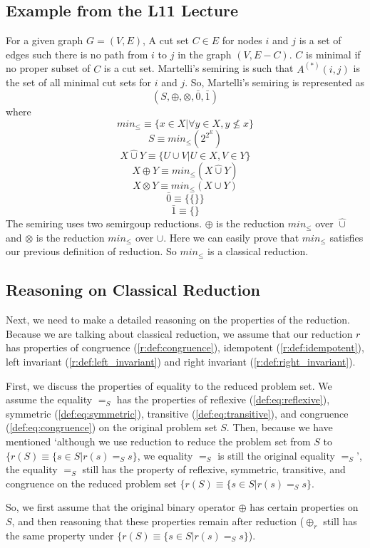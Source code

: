\documentclass[a4paper,12pt,twoside,openright]{report}
\begin{document}
\subsection{Example from the L11 Lecture}
For a given graph $G = (V,E)$, A cut set $C \in E$ for nodes $i$ and $j$ is a set of edges such there is no path from $i$ to $j$ in the graph $(V, E - C)$. $C$ is minimal if no proper subset of $C$ is a cut set. Martelli’s semiring \cite{martelli_gaussian_1976} is such that $A^{(*)}(i, j)$ is the set of all minimal cut sets for $i$ and $j$. 
So, Martelli’s semiring is represented as \[(S,\oplus,\otimes,\bar0,\bar1)\] where 
\[min_\leq \equiv \{ x \in X | \forall y \in X, y \not\leq x \}\]
\[S \equiv min_\leq(2^{2^E})\] 
\[X \hat{\cup} Y \equiv \{U \cup V | U \in X, V \in Y\}\]
\[X\oplus Y \equiv min_\leq(X \hat{\cup} Y)\] 
\[X\otimes Y \equiv min_\leq(X \cup Y)\] 
\[\bar0 \equiv \{\{\}\}\] 
\[\bar1 \equiv \{\}\]
The semiring uses two semirgoup reductions. $\oplus$ is the reduction $min_\leq$ over $\hat{\cup}$ and $\otimes$ is the reduction $min_\leq$ over $\cup$.
Here we can easily prove that $min_\leq$ satisfies our previous definition of reduction. So $min_\leq$ is a classical reduction.
\subsection{Reasoning on Classical Reduction}
Next, we need to make a detailed reasoning on the properties of the reduction.
Because we are talking about classical reduction, we assume that our reduction $r$ has properties of congruence (\ref{r:def:congruence}), idempotent (\ref{r:def:idempotent}), left invariant (\ref{r:def:left_invariant}) and right invariant (\ref{r:def:right_invariant}).

First, we discuss the properties of equality to the reduced problem set. We assume the equality $=_S$ has the properties of reflexive (\ref{def:eq:reflexive}), symmetric (\ref{def:eq:symmetric}), transitive (\ref{def:eq:transitive}), and congruence (\ref{def:eq:congruence}) on the original problem set $S$.
Then, because we have mentioned ‘although we use reduction to reduce the problem set from $S$ to $\{r(S) \equiv \{s \in S | r(s) =_S s\} $, we equality $=_S$ is still the original equality $=_S$’, the equality $=_S$ still has the property of reflexive, symmetric, transitive, and congruence on the reduced problem set $\{r(S) \equiv \{s \in S | r(s) =_S s\}$.

So, we first assume that the original binary operator $\oplus$ has certain properties on $S$, and then reasoning that these properties remain after reduction ($\oplus_r$ still has the same property under $\{r(S) \equiv \{s \in S | r(s) =_S s\}$).
\end{document}
